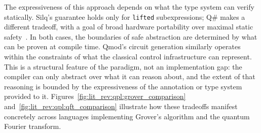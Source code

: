 The expressiveness of this approach depends on what the type system can verify statically.
Silq's guarantee holds only for \texttt{lifted} subexpressions; Q\# makes a different tradeoff, with a goal of broad hardware portability over maximal static safety~\cite{MicrosoftQSharpOverview}.
In both cases, the boundaries of safe abstraction are determined by what can be proven at compile time.
Qmod's circuit generation similarly operates within the constraints of what the classical control infrastructure can represent.
This is a structural feature of the paradigm, not an implementation gap: the compiler can only abstract over what it can reason about, and the extent of that reasoning is bounded by the expressiveness of the annotation or type system provided to it.
Figures~\ref{fig:lit_rev:qpl:grover_comparison} and~\ref{fig:lit_rev:qpl:qft_comparison} illustrate how these tradeoffs manifest concretely across languages implementing Grover's algorithm and the quantum Fourier transform.

